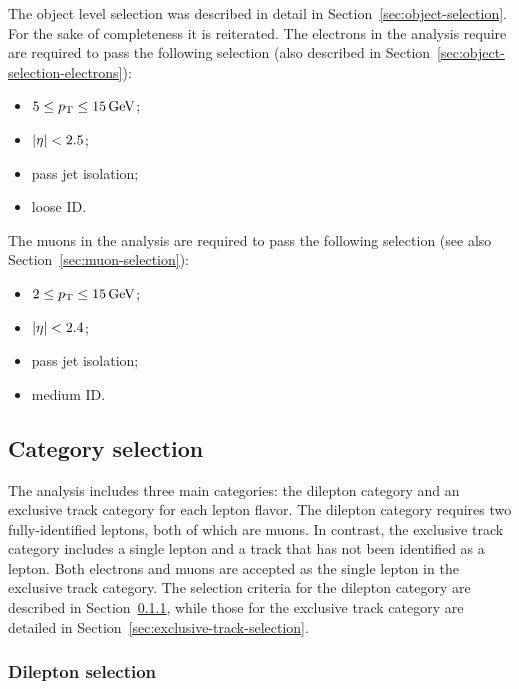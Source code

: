 The object level selection was described in detail in Section~\ref{sec:object-selection}. For the sake of completeness it is reiterated. The electrons in the analysis require are required to pass the following selection (also described in Section~\ref{sec:object-selection-electrons}):

\begin{itemize}

\item $5 \leq p_{\mathrm{T}} \leq 15\,\text{Ge\hspace{-.08em}V}$;
\item $\lvert \eta \rvert < 2.5$;
\item pass jet isolation;
\item loose ID.

\end{itemize}

The muons in the analysis are required to pass the following selection (see also Section~\ref{sec:muon-selection}):

\begin{itemize}

\item $2 \leq p_{\mathrm{T}} \leq 15\,\text{Ge\hspace{-.08em}V}$;
\item $\lvert \eta \rvert < 2.4$;
\item pass jet isolation;
\item medium ID.

\end{itemize}

\subsection{Category selection}
\label{sec:category-selection}

The analysis includes three main categories: the dilepton category and an exclusive track category for each lepton flavor. The dilepton category requires two fully-identified leptons, both of which are muons. In contrast, the exclusive track category includes a single lepton and a track that has not been identified as a lepton. Both electrons and muons are accepted as the single lepton in the exclusive track category. The selection criteria for the dilepton category are described in Section~\ref{sec:dilepton-selection}, while those for the exclusive track category are detailed in Section~\ref{sec:exclusive-track-selection}.

\subsubsection{Dilepton selection}
\label{sec:dilepton-selection}

